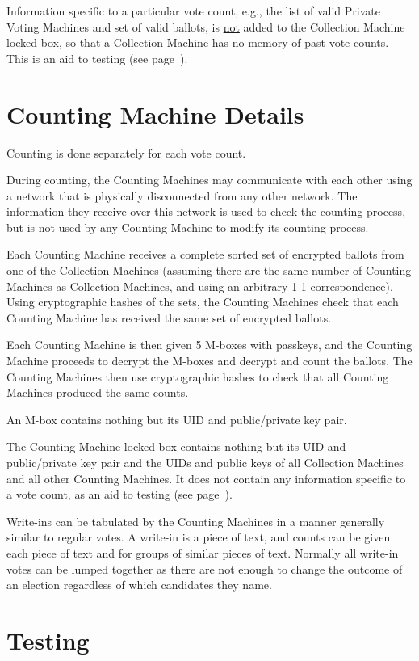 \documentclass[12pt]{article}
\newcommand{\pagref}[1]{(see page~\pageref{#1})}
\begin{document}
Information specific to a particular vote count, e.g., the
list of valid Private Voting Machines and set of valid ballots,
is \underline{not} added to the Collection Machine locked box,
so that a Collection Machine has no memory of past vote counts.
This is an aid to testing \pagref{TESTING}.

\section{Counting Machine Details}

Counting is done separately for each vote count.

During counting, the Counting Machines may communicate with
each other using a network that is physically disconnected
from any other network.  The information they receive over this
network is used to check the counting process, but is not used
by any Counting Machine to modify its counting process.

Each Counting Machine receives a complete sorted set of encrypted ballots
from one of the Collection Machines (assuming there are the same
number of Counting Machines as Collection Machines, and using an
arbitrary 1-1 correspondence).
Using cryptographic hashes of the sets, the Counting
Machines check that each Counting Machine has received the same set
of encrypted ballots.

Each Counting Machine is then given 5 M-boxes with passkeys,
and the Counting Machine proceeds to decrypt the M-boxes and
decrypt and count the ballots.  The Counting Machines then use
cryptographic hashes to check
that all Counting Machines produced the same counts.

An M-box contains nothing but its UID and public/private key pair.

The Counting Machine locked box contains nothing but its
UID and public/private key pair and the UIDs
and public keys of all Collection Machines and all other Counting Machines.
It does not contain any information specific to a vote count,
as an aid to testing \pagref{TESTING}.

Write-ins can be tabulated by the Counting Machines in a manner
generally similar to regular votes.  A write-in is a piece of
text, and counts can be given each piece of text and for groups
of similar pieces of text.  Normally all write-in votes can
be lumped together as there are not enough to change the outcome
of an election regardless of which candidates they name.

\section{Testing}\label{TESTING}
\end{document}
